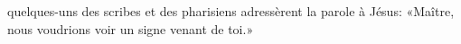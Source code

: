 \encetemps
	quelques-uns des scribes et des pharisiens adressèrent la parole à Jésus:
	«Maître, nous voudrions voir un signe venant de toi.»
